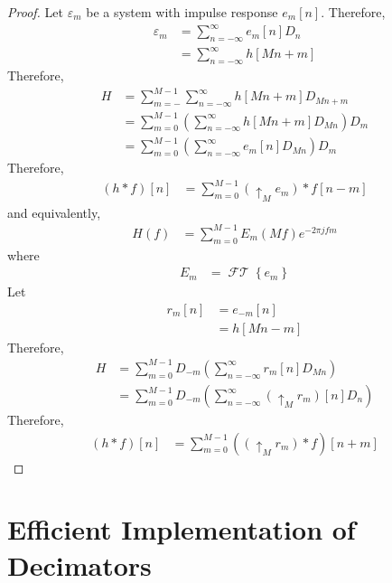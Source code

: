 \documentclass[titlepage, fleqn, a4paper, 12pt, twoside]{article}
\theoremstyle{definition}
\theoremstyle{theorem}
\DeclareMathOperator{\FT}{\mathcal{FT}}
\def\upsample#1{\uparrow_{#1}}
\begin{document}
\begin{proof}
	Let $\varepsilon_m$ be a system with impulse response $e_m[n]$.
	Therefore,
	\begin{align*}
		\varepsilon_m &= \sum\limits_{n = -\infty}^{\infty} e_m[n] D_n\\
		&= \sum\limits_{n = -\infty}^{\infty} h[M n + m]
	\end{align*}
	Therefore,
	\begin{align*}
		H &= \sum\limits_{m = -}^{M - 1} \sum\limits_{n = -\infty}^{\infty} h[M n + m] D_{M n + m}\\
		&= \sum\limits_{m = 0}^{M - 1} \left( \sum\limits_{n = -\infty}^{\infty} h[M n + m] D_{M n} \right) D_m\\
		&= \sum\limits_{m = 0}^{M - 1} \left( \sum\limits_{n = -\infty}^{\infty} e_m[n] D_{M n} \right) D_m
	\end{align*}
	Therefore,
	\begin{align*}
		(h \ast f)[n] &= \sum\limits_{m = 0}^{M - 1} (\upsample{M} e_m) \ast f[n - m]
	\end{align*}
	and equivalently,
	\begin{align*}
		H(f) &= \sum\limits_{m = 0}^{M - 1} E_m(M f) e^{-2 \pi j f m}
	\end{align*}
	where
	\begin{align*}
		E_m &= \FT\left\{ e_m \right\}
	\end{align*}
	Let
	\begin{align*}
		r_m[n] &= e_{-m}[n]\\
		&= h[M n - m]
	\end{align*}
	Therefore,
	\begin{align*}
		H &= \sum\limits_{m = 0}^{M - 1} D_{-m} \left( \sum\limits_{n = -\infty}^{\infty} r_m[n] D_{M n} \right)\\
		&= \sum\limits_{m = 0}^{M - 1} D_{-m} \left( \sum\limits_{n = -\infty}^{\infty} \left( \upsample{M} r_m \right)[n] D_n \right)
	\end{align*}
	Therefore,
	\begin{align*}
		(h \ast f)[n] &= \sum\limits_{m = 0}^{M - 1} \left( \left( \upsample{M} r_m \right) \ast f \right)[n + m]
	\end{align*}
\end{proof}

\section{Efficient Implementation of Decimators}
\end{document}
